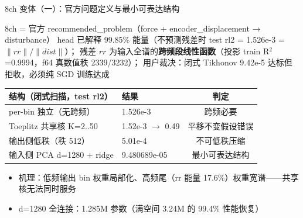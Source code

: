 \documentclass[aspectratio=169]{beamer}
\newcommand{\pos}[1]{\textcolor{blue!70!black}{#1}}
\newcommand{\con}[1]{\textcolor{orange!85!black}{#1}}
\newcommand{\HL}[1]{\textcolor{green!45!black}{#1}}
\begin{document}
\begin{frame}{8ch 变体（一）：官方问题定义与最小可表达结构}
  \begin{block}{8ch = 官方 recommended\_problem（force + encoder\_displacement → disturbance）}
    head 已解释 99.85\% 能量（不预测残差时 test rl2 = 1.526e-3 = $\lVert rr\rVert/\lVert dist\rVert$）；
    残差 $rr$ 为输入全谱的\textbf{跨频段线性函数}（投影 train R$^2$=0.9994，f64 真数值秩 2339/3232）；
    用户裁决：\con{闭式 Tikhonov 9.42e-5 达标但拒收}，必须\pos{纯 SGD 训练}达成
  \end{block}
  \begin{table}
    \centering
    \small
    \begin{tabular}{llc}
      \toprule
      结构（闭式扫描，test rl2） & 结果 & 判定 \\
      \midrule
      per-bin 独立（无跨频） & 1.526e-3 & \con{跨频必要} \\
      Toeplitz 共享核 K=2..50 & 1.52e-3 $\to$ 0.49 & \con{平移不变假设错误} \\
      输出侧低秩（秩 512） & 5.01e-4 & \con{不可低秩压缩} \\
      输入侧 PCA d=1280 + ridge & \HL{9.480689e-05} & \HL{最小可表达结构} \\
      \bottomrule
    \end{tabular}
  \end{table}
  \begin{itemize}
    \item 机理：低频输出 bin 权重局部化、高频尾（rr 能量 17.6\%）权重宽谱——共享核无法同时服务
    \item d=1280 全连接：1.285M 参数（满空间 3.24M 的 99.4\% 性能恢复）
  \end{itemize}
\end{frame}
\end{document}
